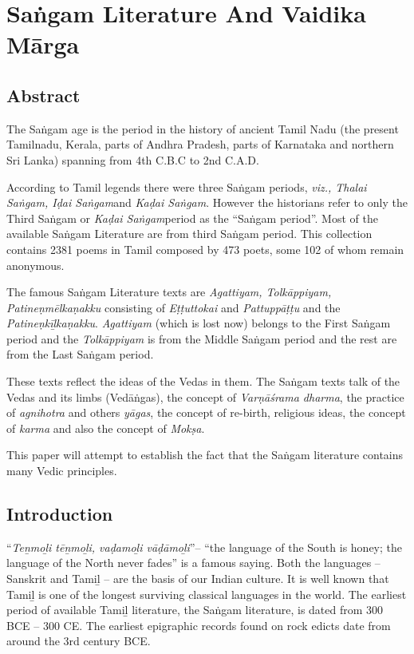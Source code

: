 
\chapter{Saṅgam Literature And Vaidika Mārga}



\section*{Abstract}

The Saṅgam age is the period in the history of ancient Tamil Nadu (the present Tamilnadu, Kerala, parts of Andhra Pradesh, parts of Karnataka and northern Sri Lanka) spanning from 4th C.B.C to 2nd C.A.D.

According to Tamil legends there were three Saṅgam periods, \textit{viz., Thalai Saṅgam, Iḍai Saṅgam}and \textit{Kaḍai Saṅgam}. However the historians refer to only the Third Saṅgam or \textit{Kaḍai Saṅgam}period as the “Saṅgam period”. Most of the available Saṅgam Literature are from third Saṅgam period. This collection contains 2381 poems in Tamil composed by 473 poets, some 102 of whom remain anonymous.

The famous Saṅgam Literature texts are \textit{Agattiyam, Tolkāppiyam, Patineṇmēlkaṇakku} consisting of \textit{Eṭṭuttokai} and \textit{Pattuppāṭṭu} and the \textit{Patineṇkīḻkaṇakku}. \textit{Agattiyam} (which is lost now) belongs to the First Saṅgam period and the \textit{Tolkāppiyam} is from the Middle Saṅgam period and the rest are from the Last Saṅgam period.

These texts reflect the ideas of the Vedas in them. The Saṅgam texts talk of the Vedas and its limbs (Vedāṅgas), the concept of \textit{Varṇāśrama dharma}, the practice of \textit{agnihotra} and others \textit{yāgas}, the concept of re-birth, religious ideas, the concept of \textit{karma} and also the concept of \textit{Mokṣa}.

This paper will attempt to establish the fact that the Saṅgam literature contains many Vedic principles.


\section*{Introduction}

“\textit{Teṉmoḻi tēṉmoḻi, vaḍamoḻi vāḍāmoḻi}”– “the language of the South is honey; the language of the North never fades” is a famous saying. Both the languages – Sanskrit and Tamiḻ – are the basis of our Indian culture. It is well known that Tamiḻ is one of the longest surviving classical languages in the world. The earliest period of available Tamiḻ literature, the Saṅgam literature, is dated from 300 BCE – 300 CE. The earliest epigraphic records found on rock edicts date from around the 3rd century BCE.

